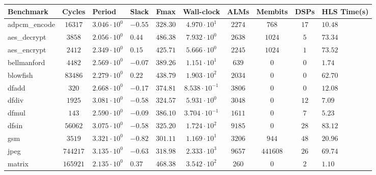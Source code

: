 \begin{tabular}{|l|c|HHc|c|c|c|cH|}
\hline
Benchmark     & Cycles       & Period                 & Slack     & Fmax       & Wall-clock              & ALMs      & Membits    & DSPs    & HLS Time(s) \\
\hline
adpcm\_encode & $ 16317    $ & $ 3.046 \cdot 10^{0} $ & $ -0.55 $ & $ 328.30 $ & $ 4.970 \cdot 10^{1}  $ & $ 2274  $ & $ 768    $ & $ 17  $ & $ 10.48   $ \\
aes\_decrypt  & $ 3858     $ & $ 2.056 \cdot 10^{0} $ & $ 0.44  $ & $ 486.38 $ & $ 7.932 \cdot 10^{0}  $ & $ 2638  $ & $ 1024   $ & $ 5   $ & $ 73.34   $ \\
aes\_encrypt  & $ 2412     $ & $ 2.349 \cdot 10^{0} $ & $ 0.15  $ & $ 425.71 $ & $ 5.666 \cdot 10^{0}  $ & $ 2245  $ & $ 1024   $ & $ 1   $ & $ 73.52   $ \\
bellmanford   & $ 4482     $ & $ 2.569 \cdot 10^{0} $ & $ -0.07 $ & $ 389.26 $ & $ 1.151 \cdot 10^{1}  $ & $ 639   $ & $ 0      $ & $ 0   $ & $ 1.74    $ \\
blowfish      & $ 83486    $ & $ 2.279 \cdot 10^{0} $ & $ 0.22  $ & $ 438.79 $ & $ 1.903 \cdot 10^{2}  $ & $ 2034  $ & $ 0      $ & $ 0   $ & $ 62.70   $ \\
dfadd         & $ 320      $ & $ 2.668 \cdot 10^{0} $ & $ -0.17 $ & $ 374.81 $ & $ 8.538 \cdot 10^{-1} $ & $ 3806  $ & $ 0      $ & $ 0   $ & $ 12.08   $ \\
dfdiv         & $ 1925     $ & $ 3.081 \cdot 10^{0} $ & $ -0.58 $ & $ 324.57 $ & $ 5.931 \cdot 10^{0}  $ & $ 3048  $ & $ 0      $ & $ 12  $ & $ 7.09    $ \\
dfmul         & $ 143      $ & $ 2.590 \cdot 10^{0} $ & $ -0.09 $ & $ 386.10 $ & $ 3.704 \cdot 10^{-1} $ & $ 1611  $ & $ 0      $ & $ 7   $ & $ 5.23    $ \\
dfsin         & $ 56062    $ & $ 3.075 \cdot 10^{0} $ & $ -0.58 $ & $ 325.20 $ & $ 1.724 \cdot 10^{2}  $ & $ 9185  $ & $ 0      $ & $ 28  $ & $ 83.12   $ \\
gsm           & $ 3519     $ & $ 3.321 \cdot 10^{0} $ & $ -0.82 $ & $ 301.11 $ & $ 1.169 \cdot 10^{1}  $ & $ 3206  $ & $ 944    $ & $ 48  $ & $ 20.96   $ \\
jpeg          & $ 744217   $ & $ 3.135 \cdot 10^{0} $ & $ -0.63 $ & $ 318.98 $ & $ 2.333 \cdot 10^{3}  $ & $ 9657  $ & $ 441608 $ & $ 26  $ & $ 69.74   $ \\
matrix        & $ 165921   $ & $ 2.135 \cdot 10^{0} $ & $ 0.37  $ & $ 468.38 $ & $ 3.542 \cdot 10^{2}  $ & $ 260   $ & $ 0      $ & $ 2   $ & $ 1.10    $ \\

\end{tabular}
